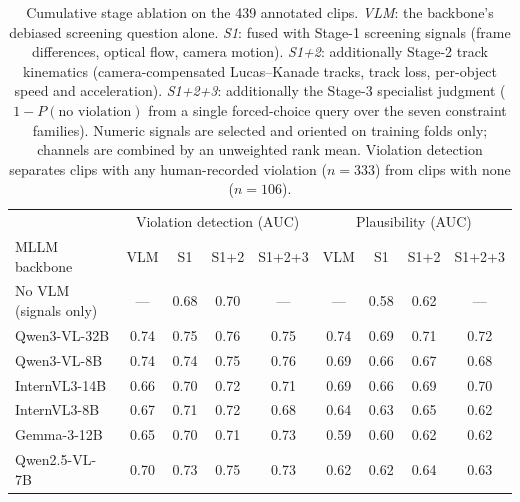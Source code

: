 \begin{table}[t]
    \centering
    \small
    \setlength{\tabcolsep}{5pt}
    \begin{tabular}{@{}lcccc|cccc@{}}
        \toprule
        & \multicolumn{4}{c|}{Violation detection (AUC)} & \multicolumn{4}{c}{Plausibility (AUC)} \\
        MLLM backbone & VLM & S1 & S1+2 & S1+2+3 & VLM & S1 & S1+2 & S1+2+3 \\
        \midrule
        No VLM (signals only) & --- & 0.68 & 0.70 & --- & --- & 0.58 & 0.62 & --- \\
        Qwen3-VL-32B & 0.74 & 0.75 & 0.76 & 0.75 & 0.74 & 0.69 & 0.71 & 0.72 \\
        Qwen3-VL-8B & 0.74 & 0.74 & 0.75 & 0.76 & 0.69 & 0.66 & 0.67 & 0.68 \\
        InternVL3-14B & 0.66 & 0.70 & 0.72 & 0.71 & 0.69 & 0.66 & 0.69 & 0.70 \\
        InternVL3-8B & 0.67 & 0.71 & 0.72 & 0.68 & 0.64 & 0.63 & 0.65 & 0.62 \\
        Gemma-3-12B & 0.65 & 0.70 & 0.71 & 0.73 & 0.59 & 0.60 & 0.62 & 0.62 \\
        Qwen2.5-VL-7B & 0.70 & 0.73 & 0.75 & 0.73 & 0.62 & 0.62 & 0.64 & 0.63 \\
        \bottomrule
    \end{tabular}
    \caption{Cumulative stage ablation on the 439 annotated clips. \emph{VLM}: the backbone's debiased screening question alone. \emph{S1}: fused with Stage-1 screening signals (frame differences, optical flow, camera motion). \emph{S1+2}: additionally Stage-2 track kinematics (camera-compensated Lucas--Kanade tracks, track loss, per-object speed and acceleration). \emph{S1+2+3}: additionally the Stage-3 specialist judgment ($1-P(\text{no violation})$ from a single forced-choice query over the seven constraint families). Numeric signals are selected and oriented on training folds only; channels are combined by an unweighted rank mean. Violation detection separates clips with any human-recorded violation ($n{=}333$) from clips with none ($n{=}106$).}
    \label{tab:stage-ablation}
\end{table}
